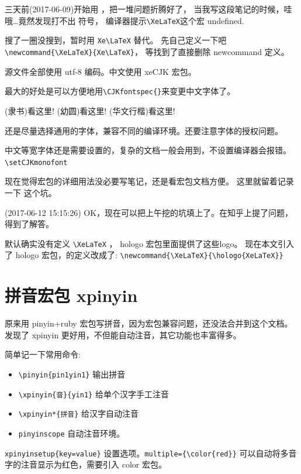 \documentclass[a4paper,11pt]{article}
\begin{document}
\section{\XeLaTeX}
三天前(2017-06-09)开始用 \XeLaTeX ，把一堆问题折腾好了，
当我写这段笔记的时候，哇哦\ldots 竟然发现打不出 \XeLaTeX 符号，
编译器提示\verb+\XeLaTeX+这个宏 undefined.

搜了一圈没搜到，暂时用 \verb+Xe\LaTeX+ 替代。
先自己定义一下吧 \verb+\newcommand{\XeLaTeX}{Xe\LaTeX}+，
等找到了直接删除 newcommand 定义。

源文件全部使用 utf-8 编码。中文使用 xeCJK 宏包。

\XeLaTeX 最大的好处是可以方便地用\verb+\CJKfontspec{}+来变更中文字体了。

{(隶书)看这里!}
{(幼圆)看这里!}
{(华文行楷)看这里!}

还是尽量选择通用的字体，兼容不同的编译环境。还要注意字体的授权问题。

中文等宽字体还是需要设置的，复杂的文档一般会用到，不设置编译器会报错。
\verb+\setCJKmonofont+

现在觉得宏包的详细用法没必要写笔记，还是看宏包文档方便。
这里就留着记录一下 \XeLaTeX 这个坑。

(2017-06-12 15:15:26)
OK，现在可以把上午挖的坑填上了。在知乎上提了问题，得到了解答。

默认确实没有定义 \verb+\XeLaTeX+ ， hologo 宏包里面提供了这些logo。
现在本文引入了 hologo 宏包，\XeLaTeX 的定义改成了:
\verb+\newcommand{\XeLaTeX}{\hologo{XeLaTeX}}+

\section{拼音宏包 xpinyin}
原来用 pinyin+ruby 宏包写拼音，因为宏包兼容问题，还没法合并到这个文档。
发现了 xpinyin 更好用，不但能自动注音，其它功能也丰富得多。

简单记一下常用命令:
\begin{itemize}
	\item \verb+\pinyin{pin1yin1}+ 输出拼音
	\item \verb+\xpinyin{音}{yin1}+ 给单个汉字手工注音
	\item \verb+\xpinyin*{拼音}+ 给汉字自动注音
	\item \verb+pinyinscope+ 自动注音环境。
\end{itemize}

\verb+xpinyinsetup{key=value}+ 设置选项。\verb+multiple={\color{red}}+
可以自动将多音字的注音显示为红色，需要引入 color 宏包。
\end{document}
